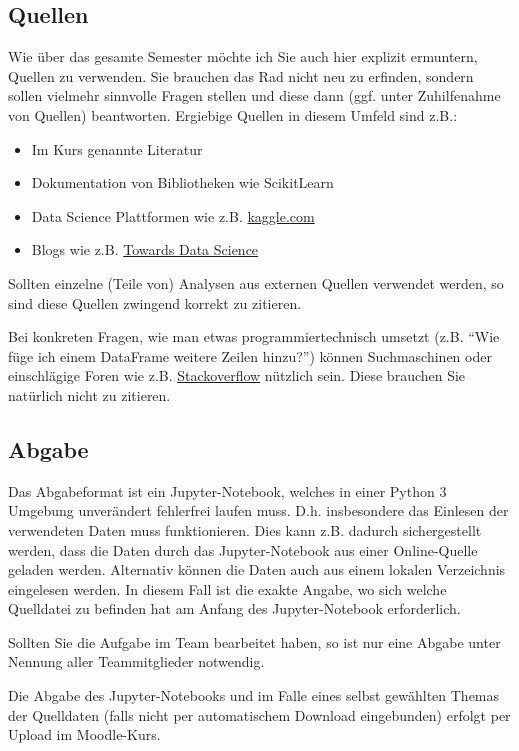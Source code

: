 \documentclass[11pt,a4paper]{article}
\begin{document}
\subsection*{Quellen}
Wie über das gesamte Semester möchte ich Sie auch hier explizit ermuntern, Quellen zu verwenden. Sie brauchen das Rad nicht neu zu erfinden, sondern sollen vielmehr sinnvolle Fragen stellen und diese dann (ggf. unter Zuhilfenahme von Quellen) beantworten. Ergiebige Quellen in diesem Umfeld sind z.B.:
\begin{itemize}
	\item Im Kurs genannte Literatur
	\item Dokumentation von Bibliotheken wie ScikitLearn
	\item Data Science Plattformen wie z.B. \href{https://www.kaggle.com/}{kaggle.com}
	\item Blogs wie z.B. \href{https://towardsdatascience.com/}{Towards Data Science}
\end{itemize}
Sollten einzelne (Teile von) Analysen aus externen Quellen verwendet werden, so sind diese Quellen zwingend korrekt zu zitieren.

Bei konkreten Fragen, wie man etwas programmiertechnisch umsetzt (z.B. "`Wie füge ich einem DataFrame weitere Zeilen hinzu?"') können Suchmaschinen oder einschlägige Foren wie z.B. \href{https://stackoverflow.com/}{Stack\-overflow} nützlich sein. Diese brauchen Sie natürlich nicht zu zitieren.


\subsection*{Abgabe}
Das Abgabeformat ist ein Jupyter-Notebook, welches in einer Python 3 Umgebung unverändert fehlerfrei laufen muss. D.h. insbesondere das Einlesen der verwendeten Daten muss funktionieren. Dies kann z.B. dadurch sichergestellt werden, dass die Daten durch das Jupyter-Notebook aus einer Online-Quelle geladen werden. Alternativ können die Daten auch aus einem lokalen Verzeichnis eingelesen werden. In diesem Fall ist die exakte Angabe, wo sich welche Quelldatei zu befinden hat  am Anfang des Jupyter-Notebook erforderlich.

Sollten Sie die Aufgabe im Team bearbeitet haben, so ist nur eine Abgabe unter Nennung aller Teammitglieder notwendig.

Die Abgabe des Jupyter-Notebooks und im Falle eines selbst gewählten Themas der Quelldaten (falls nicht per automatischem Download eingebunden) erfolgt per Upload im Moodle-Kurs.
\end{document}
